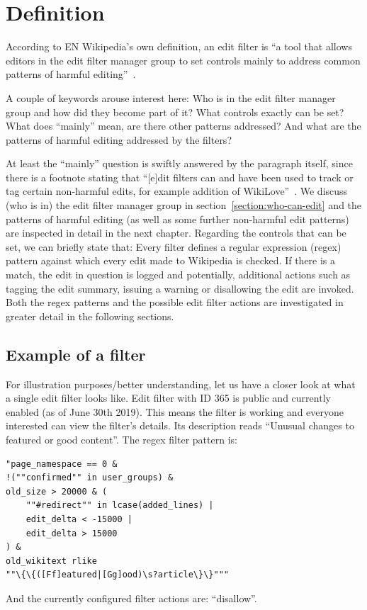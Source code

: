 \section{Definition}

According to EN Wikipedia's own definition, an edit filter is ``a tool that allows editors in the edit filter manager group to set controls mainly to address common patterns of harmful editing''~\cite{Wikipedia:EditFilter}.

A couple of keywords arouse interest here: %
Who is in the edit filter manager group and how did they become part of it?
What controls exactly can be set?
What does ``mainly'' mean, are there other patterns addressed?
And what are the patterns of harmful editing addressed by the filters?

At least the ``mainly'' question is swiftly answered by the paragraph itself, since there is a footnote stating that ``[e]dit filters can and have been used to track or tag certain non-harmful edits, for example addition of WikiLove''~\cite{Wikipedia:EditFilter}.
We discuss (who is in) the edit filter manager group in section~\ref{section:who-can-edit} and the patterns of harmful editing (as well as some further non-harmful edit patterns) are inspected in detail in the next chapter.
Regarding the controls that can be set, we can briefly state that:
Every filter defines a regular expression (regex) pattern against which every edit made to Wikipedia is checked.
If there is a match, the edit in question is logged and potentially, additional actions such as tagging the edit summary, issuing a warning or disallowing the edit are invoked.
Both the regex patterns and the possible edit filter actions are investigated in greater detail in the following sections.

\subsection{Example of a filter}

For illustration purposes/better understanding, let us have a closer look at what a single edit filter looks like.
Edit filter with ID 365 is public and currently enabled (as of June 30th 2019).
This means the filter is working and everyone interested can view the filter's details.
Its description reads ``Unusual changes to featured or good content''.
The regex filter pattern is:
\begin{verbatim}
"page_namespace == 0 &
!(""confirmed"" in user_groups) &
old_size > 20000 & (
    ""#redirect"" in lcase(added_lines) |
    edit_delta < -15000 |
    edit_delta > 15000
) &
old_wikitext rlike
""\{\{([Ff]eatured|[Gg]ood)\s?article\}\}"""
\end{verbatim}
And the currently configured filter actions are: ``disallow''.

